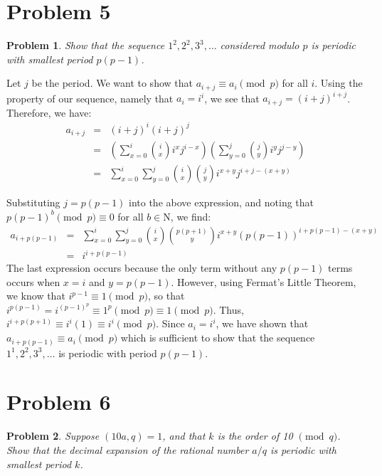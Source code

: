 \documentclass[psamsfonts]{amsart}
\newtheorem{prob}{Problem}[section]
\newenvironment{sol}{{\bfseries Solution}}{\qedsymbol}
\theoremstyle{definition}
\theoremstyle{remark}
\numberwithin{equation}{section}
\begin{document}
\section{Problem 5}

\begin{prob}
Show that the sequence $1^2, 2^2, 3^3, \ldots$ considered modulo $p$ is periodic with smallest period $p(p-1)$. 
\end{prob}

\begin{sol}
Let $j$ be the period. We want to show that $a_{i + j} \equiv a_{i} \pmod{p}$ for all $i$. Using the property of our sequence, namely that $a_i = i^i$, we see that $a_{i+j} = (i + j)^{i + j}$. Therefore, we have:
\begin{eqnarray}
a_{i + j} &=& (i + j)^i (i + j)^j \\
&=& \left( \sum_{x=0}^i {i \choose x} i^x j ^{i - x} \right) \left( \sum_{y=0}^j {j \choose y} i^y j^{j - y} \right) \\
&=& \sum_{x=0}^{i} \sum_{y=0}^j {i \choose x}{j \choose y} i^{x + y} j^{i + j - (x+y)} 
\end{eqnarray} 

Substituting $j = p(p-1)$ into the above expression, and noting that $p(p-1)^{b} \pmod{p} \equiv 0$ for all $b \in \mathrm{N}$, we find:
\begin{eqnarray}
a_{i + p(p-1)} &=& \sum_{x=0}^i \sum_{y=0}^j {i \choose x}{p(p+1) \choose y} i^{x+y} (p(p-1))^{i + p(p-1) - (x+y)} \\
&=& i^{i + p(p-1)} 
\end{eqnarray}
The last expression occurs because the only term without any $p(p-1)$ terms occurs when $x = i$ and $y = p(p-1)$. However, using Fermat's Little Theorem, we know that $i^{p-1} \equiv 1 \pmod{p}$, so that $i^{p(p-1)} = i^{(p-1)^p} \equiv 1^{p} \pmod{p} \equiv 1 \pmod{p}$. Thus, $i^{i + p(p+1)} \equiv i^{i}(1) \equiv i^i \pmod{p}$. Since $a_i = i^i$, we have shown that $a_{i + p(p-1)} \equiv a_i \pmod{p}$ which is sufficient to show that the sequence $1^1, 2^2, 3^3, \ldots$ is periodic with period $p(p-1)$. 
\end{sol}

\section{Problem 6}

\begin{prob}
Suppose $(10a, q) = 1$, and that $k$ is the order of 10 $\pmod{q}$. Show that the decimal expansion of the rational number $a/q$ is periodic with smallest period $k$. 
\end{prob}
\end{document}
